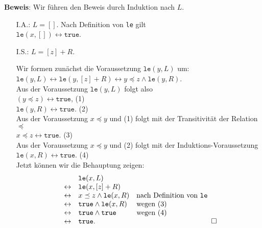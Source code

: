 \noindent
\textbf{Beweis}: Wir f\"uhren den Beweis durch Induktion nach $L$.
\begin{enumerate}
\item[I.A.:] $L = []$. Nach Definition von \texttt{le} gilt \\[0.1cm]
      \hspace*{1.3cm} $\mathtt{le}(x,[]) \leftrightarrow \mathtt{true}$.
\item[I.S.:] $L = [z] + R$.

     Wir formen zun\"achst die Voraussetzung $\mathtt{le}(y,L)$ um: \\[0.1cm]
     \hspace*{1.3cm} 
     $\mathtt{le}(y,L) \leftrightarrow \mathtt{le}(y,[z] + R) \leftrightarrow y \preceq z \wedge \mathtt{le}(y, R)$. 
     \\[0.1cm]
     Aus der Voraussetzung $\mathtt{le}(y,L)$ folgt also \\[0.1cm]
     \hspace*{1.3cm} $(y \preceq z) \leftrightarrow \mathtt{true}$, \hspace*{\fill} (1) \\[0.1cm]
     \hspace*{1.3cm} $\mathtt{le}(y,R) \leftrightarrow \mathtt{true}$.  \hspace*{\fill} (2) \\[0.1cm]
     Aus der Voraussetzung $x \preceq y$ und (1) folgt mit der Transitivit\"at der Relation $\preceq$ \\[0.1cm]
     \hspace*{1.3cm} $x \preceq z \leftrightarrow \mathtt{true}$. \hspace*{\fill} (3) \\[0.1cm]
     Aus der Voraussetzung $x \preceq y$ und (2) folgt mit der Induktions-Voraussetzung \\[0.1cm]
     \hspace*{1.3cm} $\mathtt{le}(x, R) \leftrightarrow \mathtt{true}$. \hspace*{\fill} (4) \\[0.1cm]
     Jetzt k\"onnen wir die Behauptung zeigen: 
     $$
     \begin{array}[b]{cll}
        & \mathtt{le}(x, L) \\
      \leftrightarrow & \mathtt{le}(x, [z] + R) \\
      \leftrightarrow & x \preceq z \wedge \mathtt{le}(x, R)   &          \mbox{nach Definition von \texttt{le}} \\
      \leftrightarrow & \mathtt{true} \wedge \mathtt{le}(x, R) &          \mbox{wegen (3)} \\
      \leftrightarrow & \mathtt{true} \wedge \mathtt{true}     &          \mbox{wegen (4)} \\
      \leftrightarrow & \mathtt{true}.  &
     \end{array}\hspace*{\fill} \Box
     $$
\end{enumerate}


